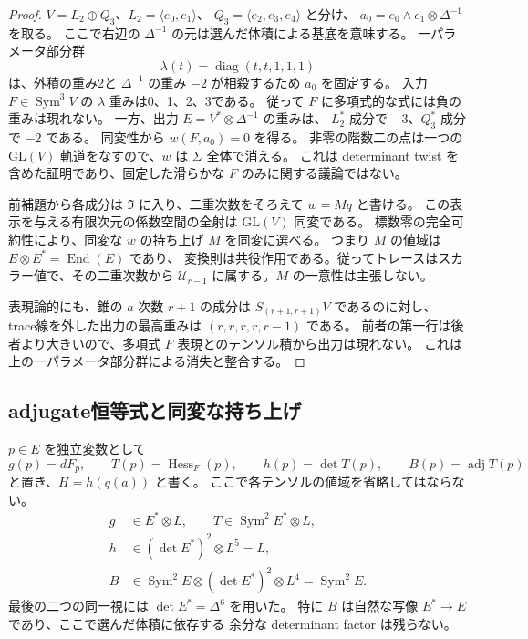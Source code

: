 \documentclass[a4paper,11pt]{ltjsarticle}
\theoremstyle{definition}
\begin{document}
\begin{proof}
$V=L_2\oplus Q_3$、$L_2=\langle e_0,e_1\rangle$、
$Q_3=\langle e_2,e_3,e_4\rangle$ と分け、
$a_0=e_0\wedge e_1\otimes\Delta^{-1}$ を取る。
ここで右辺の $\Delta^{-1}$ の元は選んだ体積による基底を意味する。
一パラメータ部分群
\[
 \lambda(t)=\operatorname{diag}(t,t,1,1,1)
\]
は、外積の重み2と $\Delta^{-1}$ の重み $-2$ が相殺するため $a_0$ を固定する。
入力 $F\in\operatorname{Sym}^3V$ の $\lambda$ 重みは0、1、2、3である。
従って $F$ に多項式的な式には負の重みは現れない。
一方、出力 $E=V^*\otimes\Delta^{-1}$ の重みは、
$L_2^*$ 成分で $-3$、$Q_3^*$ 成分で $-2$ である。
同変性から $w(F,a_0)=0$ を得る。
非零の階数二の点は一つの $\mathrm{GL}(V)$ 軌道をなすので、$w$ は $\Sigma$ 全体で消える。
これは determinant twist を含めた証明であり、固定した滑らかな $F$ のみに関する議論ではない。

前補題から各成分は $\mathfrak I$ に入り、二重次数をそろえて $w=Mq$ と書ける。
この表示を与える有限次元の係数空間の全射は $\mathrm{GL}(V)$ 同変である。
標数零の完全可約性により、同変な $w$ の持ち上げ $M$ を同変に選べる。
つまり $M$ の値域は $E\otimes E^*=\operatorname{End}(E)$ であり、
変換則は共役作用である。従ってトレースはスカラー値で、その二重次数から
$\mathcal U_{r-1}$ に属する。$M$ の一意性は主張しない。

表現論的にも、錐の $a$ 次数 $r+1$ の成分は $S_{(r+1,r+1)}V$ であるのに対し、
trace線を外した出力の最高重みは $(r,r,r,r,r-1)$ である。
前者の第一行は後者より大きいので、多項式 $F$ 表現とのテンソル積から出力は現れない。
これは上の一パラメータ部分群による消失と整合する。
\end{proof}

\subsection{adjugate恒等式と同変な持ち上げ}

$p\in E$ を独立変数として
\[
 g(p)=dF_p,\qquad T(p)=\operatorname{Hess}_F(p),\qquad
 h(p)=\det T(p),\qquad B(p)=\operatorname{adj}T(p)
\]
と置き、$H=h(q(a))$ と書く。
ここで各テンソルの値域を省略してはならない。
\[
\begin{split}
 g&\in E^*\otimes L,\qquad
 T\in\operatorname{Sym}^2E^*\otimes L,\\
 h&\in(\det E^*)^2\otimes L^5=L,\\
 B&\in\operatorname{Sym}^2E\otimes(\det E^*)^2\otimes L^4
      =\operatorname{Sym}^2E.
\end{split}
\]
最後の二つの同一視には $\det E^*=\Delta^6$ を用いた。
特に $B$ は自然な写像 $E^*\to E$ であり、ここで選んだ体積に依存する
余分な determinant factor は残らない。
\end{document}
